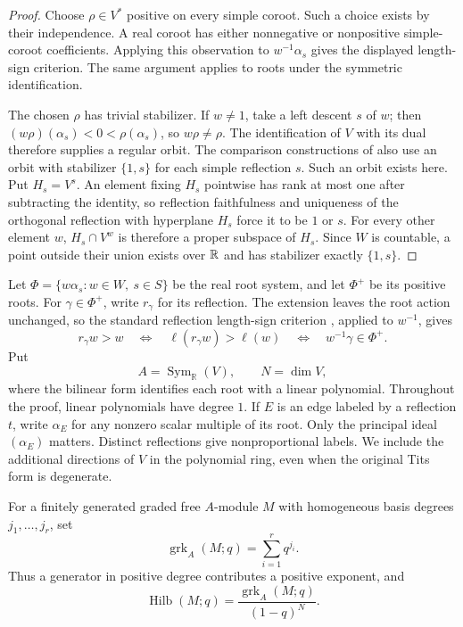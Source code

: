 \begin{proof}
Choose $\rho\in V^*$ positive on every simple coroot.  Such a choice exists
by their independence.  A real coroot has either nonnegative or nonpositive
simple-coroot coefficients.  Applying this observation to
$w^{-1}\alpha_s$ gives the displayed length-sign criterion.  The same
argument applies to roots under the symmetric identification.

The chosen $\rho$ has trivial stabilizer. If $w\ne1$, take a left descent
$s$ of $w$; then $(w\rho)(\alpha_s)<0<\rho(\alpha_s)$, so $w\rho\ne\rho$.
The identification of $V$ with its dual therefore supplies a regular orbit.
The comparison constructions of \cite[Sections~2 and~5]{Fiebig08} also
use an orbit with stabilizer $\{1,s\}$ for each simple reflection $s$.
Such an orbit exists here. Put $H_s=V^s$. An element fixing $H_s$ pointwise
has rank at most one after subtracting the identity, so reflection
faithfulness and uniqueness of the orthogonal reflection with hyperplane
$H_s$ force it to be $1$ or $s$. For every other element $w$,
$H_s\cap V^w$ is therefore a proper subspace of $H_s$.
Since $W$ is countable, a point outside their union exists over $\mathbb R$
and has stabilizer exactly $\{1,s\}$.
\end{proof}

Let $\Phi=\{w\alpha_s:w\in W,\ s\in S\}$ be the real root system,
and let $\Phi^+$ be its positive roots. For $\gamma\in\Phi^+$, write
$r_\gamma$ for its reflection. The extension leaves the root action
unchanged, so the standard reflection length-sign criterion
\cite[Proposition~4.4.6]{BB05}, applied to $w^{-1}$, gives
\begin{equation}\label{eq:bg-reflection-sign}
 r_\gamma w>w
 \quad\Longleftrightarrow\quad
 \ell(r_\gamma w)>\ell(w)
 \quad\Longleftrightarrow\quad
 w^{-1}\gamma\in\Phi^+.
\end{equation}
Put
\[
 A=\operatorname{Sym}_{\mathbb R}(V),\qquad N=\dim V,
\]
where the bilinear form identifies each root with a linear polynomial.
Throughout the proof, linear polynomials have degree $1$.  If $E$ is an edge
labeled by a reflection $t$, write $\alpha_E$ for any nonzero scalar multiple
of its root.  Only the principal ideal $(\alpha_E)$ matters.  Distinct
reflections give nonproportional labels.  We include the additional
directions of $V$ in the polynomial ring, even when the original Tits form
is degenerate.

For a finitely generated graded free $A$-module $M$ with homogeneous basis
degrees $j_1,\ldots,j_r$, set
\[
 \operatorname{grk}_A(M;q)=\sum_{i=1}^r q^{j_i}.
\]
Thus a generator in positive degree contributes a positive exponent, and
\[
 \operatorname{Hilb}(M;q)
 =\frac{\operatorname{grk}_A(M;q)}{(1-q)^N}.
\]

